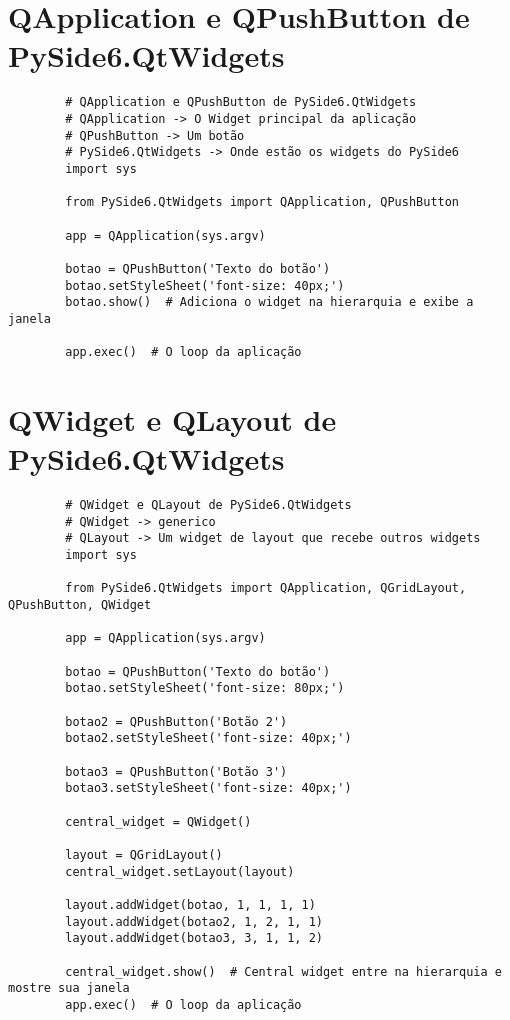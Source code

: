 \documentclass[12pt,a4paper]{article}
\begin{document}
    \section{QApplication e QPushButton de PySide6.QtWidgets}
    \begin{lstlisting}
        # QApplication e QPushButton de PySide6.QtWidgets
        # QApplication -> O Widget principal da aplicação
        # QPushButton -> Um botão
        # PySide6.QtWidgets -> Onde estão os widgets do PySide6
        import sys

        from PySide6.QtWidgets import QApplication, QPushButton

        app = QApplication(sys.argv)

        botao = QPushButton('Texto do botão')
        botao.setStyleSheet('font-size: 40px;')
        botao.show()  # Adiciona o widget na hierarquia e exibe a janela

        app.exec()  # O loop da aplicação
    \end{lstlisting}

    \section{QWidget e QLayout de PySide6.QtWidgets}
    \begin{lstlisting}
        # QWidget e QLayout de PySide6.QtWidgets
        # QWidget -> generico
        # QLayout -> Um widget de layout que recebe outros widgets
        import sys

        from PySide6.QtWidgets import QApplication, QGridLayout, QPushButton, QWidget

        app = QApplication(sys.argv)

        botao = QPushButton('Texto do botão')
        botao.setStyleSheet('font-size: 80px;')

        botao2 = QPushButton('Botão 2')
        botao2.setStyleSheet('font-size: 40px;')

        botao3 = QPushButton('Botão 3')
        botao3.setStyleSheet('font-size: 40px;')

        central_widget = QWidget()

        layout = QGridLayout()
        central_widget.setLayout(layout)

        layout.addWidget(botao, 1, 1, 1, 1)
        layout.addWidget(botao2, 1, 2, 1, 1)
        layout.addWidget(botao3, 3, 1, 1, 2)

        central_widget.show()  # Central widget entre na hierarquia e mostre sua janela
        app.exec()  # O loop da aplicação
            \end{lstlisting}
\end{document}
